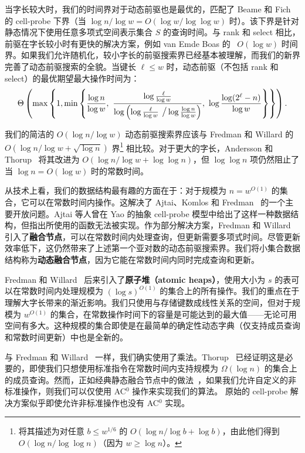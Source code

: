 \documentclass[11pt,a4paper]{ctexart}
\begin{document}
当字长较大时，我们的时间界对于动态前驱也是最优的，匹配了 Beame 和 Fich~\cite{beame02pred} 的 cell-probe 下界（当 $\log n/\log w = O(\log w/\log\log w)$ 时）。该下界是针对静态情况下使用任意多项式空间表示集合 $S$ 的查询时间。与 rank 和 select 相比，前驱在字长较小时有更快的解决方案，例如 van Emde Boas 的~\cite{vEB77pred} $O(\log w)$ 时间界。如果我们允许随机化，较小字长的前驱搜索界已经基本被理解，而我们的新界完善了动态前驱搜索的全貌。当键长 $\ell \leq w$ 时，动态前驱（不包括 rank 和 select）的最优期望最大操作时间为：
\[
\Theta\left(\max\left\{1,\min \left\{
  \frac{\log n}{\log w},\
  \frac{\log \frac{\ell}{\log w}}{\log \left( \log \frac{\ell}{\log w}
    \textrm{\large~/} \log\frac{\log n}{\log w} \right)},\
  \log \frac{\log (2^\ell-n)}{\log w}
 \right\}\right\}\right).
\]

我们的简洁的 $O(\log n/\log w)$ 动态前驱搜索界应该与 Fredman 和 Willard 的~\cite{fredman93fusion} $O(\log n/\log w + \sqrt{\log n})$ 界\footnote{\cite{fredman93fusion} 将其描述为对任意 $b \leq w^{1/6}$ 的 $O(\log n/\log b + \log b)$，由此他们得到 $O(\log n/\log\log n)$（因为 $w \geq \log n$）。} 相比较。对于更大的字长，Andersson 和 Thorup~\cite{andersson07exptrees} 将其改进为 $O(\log n/\log w + \log\log n)$，但 $\log\log n$ 项仍然阻止了当 $\log n = O(\log w)$ 时的常数时间。

从技术上看，我们的数据结构最有趣的方面在于：对于规模为 $n = w^{O(1)}$ 的集合，它可以在常数时间内操作。这解决了 Ajtai、Komlos 和 Fredman~\cite{ajtai84hashing} 的一个主要开放问题。Ajtai 等人曾在 Yao 的抽象 cell-probe 模型中给出了这样一种数据结构，但指出所使用的函数无法被实现。作为部分解决方案，Fredman 和 Willard~\cite{fredman93fusion} 引入了\textbf{融合节点}，可以在常数时间内处理查询，但更新需要多项式时间。尽管更新效率低下，这仍然带来了上述第一个亚对数的动态前驱搜索界。我们将小集合数据结构称为\textbf{动态融合节点}，因为它能在常数时间内同时完成查询和更新。

Fredman 和 Willard~\cite{fredman94atomic} 后来引入了\textbf{原子堆（atomic heaps）}，使用大小为 $s$ 的表可以在常数时间内处理规模为 $(\log s)^{O(1)}$ 的集合上的所有操作。我们的重点在于理解大字长带来的渐近影响。我们只使用与存储键数成线性关系的空间，但对于规模为 $w^{O(1)}$ 的集合，在常数操作时间下的容量是可能达到的最大值——无论可用空间有多大。这种规模的集合即使是在最简单的确定性动态字典（仅支持成员查询和常数时间更新）中也是全新的。

与 Fredman 和 Willard~\cite{fredman93fusion,fredman94atomic} 一样，我们确实使用了乘法。Thorup~\cite{Tho03} 已经证明这是必要的，即使我们只想使用标准指令在常数时间内支持规模为 $\Omega(\log n)$ 的集合上的成员查询。然而，正如经典静态融合节点中的做法~\cite{andersson99fusion}，如果我们允许自定义的非标准操作，则我们可以仅使用 AC$^0$ 操作来实现我们的算法。\cite{ajtai84hashing} 原始的 cell-probe 解决方案似乎即使允许非标准操作也没有 AC$^0$ 实现。
\end{document}
